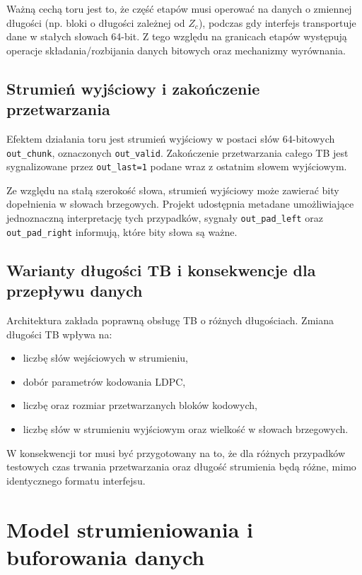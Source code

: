 Ważną cechą toru jest to, że część etapów musi operować na danych o zmiennej długości (np. bloki o długości zależnej od $Z_c$), podczas gdy interfejs transportuje dane w stałych słowach 64-bit. Z tego względu na granicach etapów występują operacje składania/rozbijania danych bitowych oraz mechanizmy wyrównania.

\subsection{Strumień wyjściowy i zakończenie przetwarzania}
Efektem działania toru jest strumień wyjściowy w postaci słów 64-bitowych \texttt{out\_chunk}, oznaczonych \texttt{out\_valid}. Zakończenie przetwarzania całego TB jest sygnalizowane przez \texttt{out\_last=1} podane wraz z ostatnim słowem wyjściowym.

Ze względu na stałą szerokość słowa, strumień wyjściowy może zawierać bity dopełnienia w słowach brzegowych. Projekt udostępnia metadane umożliwiające jednoznaczną interpretację tych przypadków, sygnały \texttt{out\_pad\_left} oraz \texttt{out\_pad\_right} informują, które bity słowa są ważne.

\subsection{Warianty długości TB i konsekwencje dla przepływu danych}
Architektura zakłada poprawną obsługę TB o różnych długościach. Zmiana długości TB wpływa na:
\begin{itemize}
    \item liczbę słów wejściowych w strumieniu,
    \item dobór parametrów kodowania LDPC,
    \item liczbę oraz rozmiar przetwarzanych bloków kodowych,
    \item liczbę słów w strumieniu wyjściowym oraz wielkość  w słowach brzegowych.
\end{itemize}

W konsekwencji tor musi być przygotowany na to, że dla różnych przypadków testowych czas trwania przetwarzania oraz długość strumienia będą różne, mimo identycznego formatu interfejsu.


\section{Model strumieniowania i buforowania danych}
\label{sec:strumieniowanie_buforowanie}

